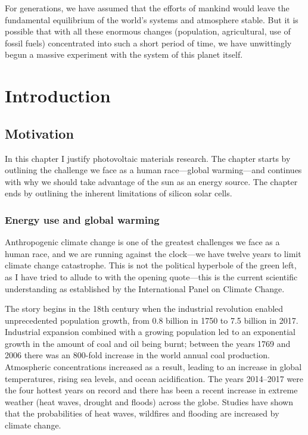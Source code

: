 \begin{savequote}[8cm]
For generations, we have assumed that the efforts of mankind would leave the fundamental equilibrium of the world's systems and atmosphere stable. But it is possible that with all these enormous changes (population, agricultural, use of fossil fuels) concentrated into such a short period of time, we have unwittingly begun a massive experiment with the system of this planet itself.
\end{savequote}

\chapter{\label{ch:1-intro}Introduction} 

\minitoc

\section{Motivation}

In this chapter I justify photovoltaic materials research. The chapter starts by outlining the challenge we face as a human race---global warming---and continues with why we should take advantage of the sun as an energy source. The chapter ends by outlining the inherent limitations of silicon solar cells. 

\subsection{Energy use and global warming}

Anthropogenic climate change is one of the greatest challenges we face as a human race, and we are running against the clock---we have twelve years to limit climate change catastrophe. This is not the political hyperbole of the green left, as I have tried to allude to with the opening quote---this is the current scientific understanding as established by the International Panel on Climate Change. 

The story begins in the 18th century when the industrial revolution enabled unprecedented population growth, from 0.8 billion in 1750 to 7.5 billion in 2017.\autocite{Kaneda2017}
Industrial expansion combined with a growing population led to an exponential growth in the amount of coal and oil being burnt; between the years 1769 and 2006 there was an 800-fold increase in the world annual coal production.\autocite{MacKay2009}
Atmospheric  concentrations increased as a result, leading to an increase in global temperatures, rising sea levels, and ocean acidification. The years 2014--2017 were the four hottest years on record \autocite{gistemp2018} and there has been a recent increase in extreme weather (heat waves, drought and floods) across the globe.\autocite{easac2018} Studies have shown that the probabilities of heat waves,\autocite{Black2016} wildfires\autocite{Abatzoglou2016} and flooding \autocite{Sweet2016,vanderWiel2017} are increased by climate change.


